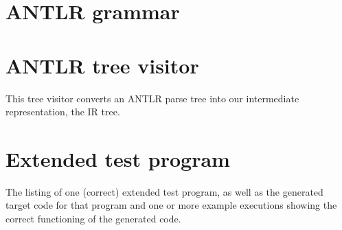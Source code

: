 \documentclass[a4paper]{article}
\begin{document}
\begin{appendices}

\label{grammar}
\section{ANTLR grammar}



\label{visitor}
\section{ANTLR tree visitor}
This tree visitor converts an ANTLR parse tree into our intermediate representation, the IR tree.



\section{Extended test program}
The listing of one (correct) extended test program, as well as the generated
target code for that program and one or more example executions showing the correct functioning of the generated code.

\end{appendices}
\end{document}
